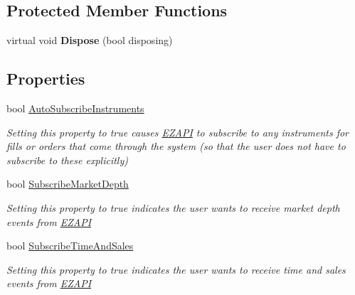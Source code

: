 \subsection*{Protected Member Functions}
\begin{DoxyCompactItemize}
\item 
\hypertarget{class_e_z_a_p_i_1_1_t_t_a_p_i_functions_ac841e7c12c53a9ca6e0557335133936b}{virtual void {\bfseries Dispose} (bool disposing)}\label{class_e_z_a_p_i_1_1_t_t_a_p_i_functions_ac841e7c12c53a9ca6e0557335133936b}

\end{DoxyCompactItemize}
\subsection*{Properties}
\begin{DoxyCompactItemize}
\item 
bool \hyperlink{class_e_z_a_p_i_1_1_t_t_a_p_i_functions_ab4aee7e6bb8e8113fe04704c4a19e815}{Auto\-Subscribe\-Instruments}
\begin{DoxyCompactList}\small\item\em Setting this property to true causes \hyperlink{namespace_e_z_a_p_i}{E\-Z\-A\-P\-I} to subscribe to any instruments for fills or orders that come through the system (so that the user does not have to subscribe to these explicitly) \end{DoxyCompactList}\item 
bool \hyperlink{class_e_z_a_p_i_1_1_t_t_a_p_i_functions_a2fa717eefc5d5f69004ac43e4368c9d0}{Subscribe\-Market\-Depth}
\begin{DoxyCompactList}\small\item\em Setting this property to true indicates the user wants to receive market depth events from \hyperlink{namespace_e_z_a_p_i}{E\-Z\-A\-P\-I} \end{DoxyCompactList}\item 
bool \hyperlink{class_e_z_a_p_i_1_1_t_t_a_p_i_functions_a96e35a16a2ba3b3975b0918562b12837}{Subscribe\-Time\-And\-Sales}
\begin{DoxyCompactList}\small\item\em Setting this property to true indicates the user wants to receive time and sales events from \hyperlink{namespace_e_z_a_p_i}{E\-Z\-A\-P\-I} \end{DoxyCompactList}\item 

\end{DoxyCompactItemize}
